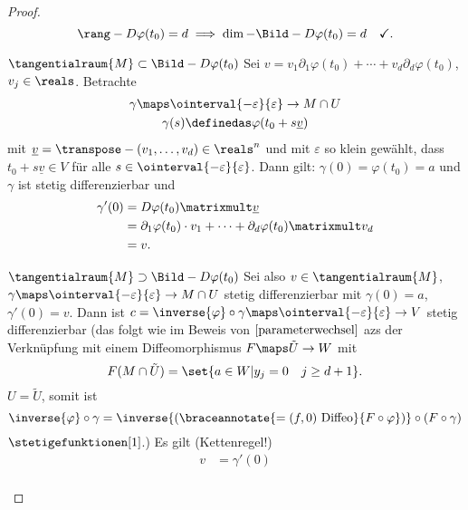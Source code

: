 \begin{proof}
  \begin{equation*}
    \rang-{D\varphi(t_0)=d\implies \dim-{\Bild-{D\varphi(t_0)}}}=d\quad \checkmark.
  \end{equation*}
  \begin{proofdescription}
    \item[\( \tangentialraum{M}\subset \Bild-{D\varphi(t_0)} \)]
    Sei \( v=v_1\partial_1 \varphi(t_0)+\dotsb+v_d\partial_d \varphi(t_0) \), \( v_j\in \reals \). Betrachte 
    \begin{gather*}
      \gamma\maps \ointerval{-\varepsilon}{\varepsilon}\to M\cap U\\
      \gamma(s)\definedas \varphi(t_0+s\underline{v})
    \end{gather*}
    mit \( \underline{v}=\transpose-{(v_1,\dotsc,v_d)}\in \reals^n \) und mit \( \varepsilon \) so klein gewählt, dass \( t_0+s\underline{v}\in V \) für alle \( s\in \ointerval{-\varepsilon}{\varepsilon} \). Dann gilt: \( \gamma(0)=\varphi(t_0)=a \) und \( \gamma \) ist stetig differenzierbar und
    \begin{align*}
      \gamma'(0)&=D\varphi(t_0)\matrixmult \underline{v}\\
      &=\partial_1 \varphi(t_0)\cdot v_1+\dotsb+\partial_d\varphi(t_0)\matrixmult v_d\\
      &=v.
    \end{align*}
    \item[\( \tangentialraum{M}\supset \Bild-{D\varphi(t_0)} \)] Sei also \( v\in \tangentialraum{M} \), \( \gamma\maps \ointerval{-\varepsilon}{\varepsilon}\to M\cap U \) stetig differenzierbar mit \( \gamma(0)=a \), \( \gamma'(0)=v \). Dann ist \( c=\inverse{\varphi}\circ \gamma\maps \ointerval{-\varepsilon}{\varepsilon}\to V  \) stetig differenzierbar (das folgt wie im Beweis von \( \ref{parameterwechsel} \) azs der Verknüpfung mit einem Diffeomorphismus \( F\maps \tilde{U}\to W \) mit
    \begin{equation*}
      F(M\cap \tilde{U})=\set{a\in W|y_j=0\quad j\geq d+1}.
    \end{equation*} 
    \Obda \( U=\tilde{U} \), somit ist
    \begin{equation*}
      \inverse{\varphi}\circ \gamma=\inverse{(\braceannotate{=(f,0)\text{\ Diffeo}}{F\circ \varphi})}\circ (F\circ \gamma)
    \end{equation*}
    \( \stetigefunktionen[1] \).) Es gilt (Kettenregel!)
    \begin{align*}
      v&=\gamma'(0)\\

\end{align*}
\end{proofdescription}
\end{proof}
